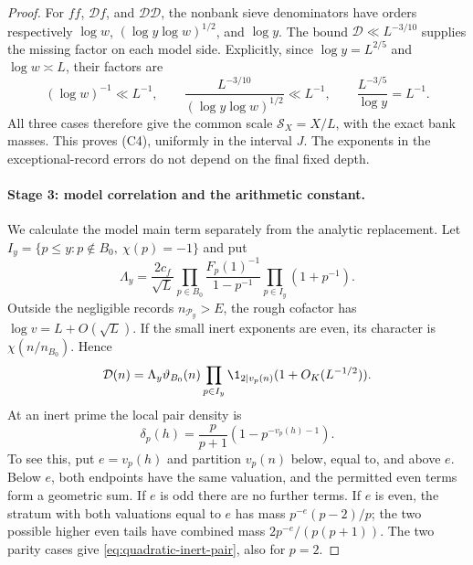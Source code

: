 \begin{proof}
For \(ff\), \(\mathcal D f\), and \(\mathcal D\mathcal D\), the nonbank sieve
denominators have orders respectively
\(\log w\), \((\log y\log w)^{1/2}\), and \(\log y\).
The bound \(\mathcal D\ll L^{-3/10}\) supplies the missing factor
on each model side. Explicitly, since \(\log y=L^{2/5}\)
and \(\log w\asymp L\), their factors are
\[
 (\log w)^{-1}\ll L^{-1},\qquad
 \frac{L^{-3/10}}{(\log y\log w)^{1/2}}\ll L^{-1},\qquad
 \frac{L^{-3/5}}{\log y}=L^{-1}.
\]
All three cases therefore give the common
scale \(\mathcal S_X=X/L\), with the exact bank masses.
This proves (C4), uniformly in the interval \(J\). The exponents
in the exceptional-record errors do not depend on the final
fixed depth.

\paragraph{Stage 3: model correlation and the arithmetic constant.}
We calculate the model main term separately from the analytic replacement. Let
\(I_y=\{p\le y:p\notin B_0,\ \chi(p)=-1\}\) and put
\[
 \Lambda_y=\frac{2c_f}{\sqrt L}
      \prod_{p\in B_0}\frac{F_p(1)^{-1}}{1-p^{-1}}
      \prod_{p\in I_y}(1+p^{-1}).
\]
Outside the negligible records \(n_{\mathcal P_y}>E\), the rough cofactor
has \(\log v=L+O(\sqrt L)\). If the small inert exponents
are even, its character is \(\chi(n/n_{B_0})\). Hence
\begin{equation}\label{eq:quadratic-model-leading}
 \mathcal D(n)=\Lambda_y\vartheta_{B_0}(n)
            \prod_{p\in I_y}\1_{2\mid v_p(n)}
                                      (1+O_K(L^{-1/2})).
\end{equation}
At an inert prime the local pair density is
\begin{equation}\label{eq:quadratic-inert-pair}
 \delta_p(h)=\frac p{p+1}(1-p^{-v_p(h)-1}).
\end{equation}
To see this, put \(e=v_p(h)\) and partition \(v_p(n)\)
below, equal to, and above \(e\). Below \(e\), both endpoints
have the same valuation, and the permitted even terms form a
geometric sum. If \(e\) is odd there are no further terms.
If \(e\) is even, the stratum with both valuations equal to
\(e\) has mass \(p^{-e}(p-2)/p\); the two possible higher
even tails have combined mass \(2p^{-e}/(p(p+1))\).
The two parity cases give \eqref{eq:quadratic-inert-pair}, also
for \(p=2\).


\end{proof}
